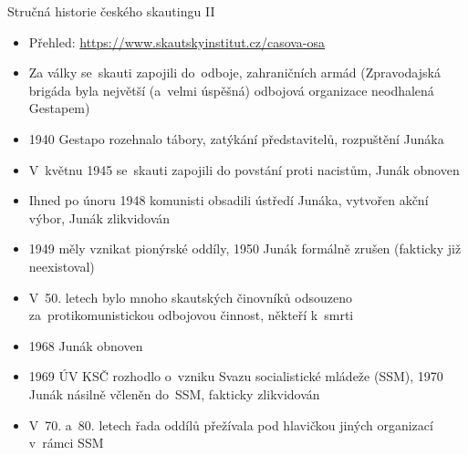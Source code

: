 \documentclass[compress, xelatex, 11pt, xcolor=dvipsnames, print, aspectratio=169,
	hyperref={
		bookmarks=true,
		unicode=true,
		colorlinks=true,
		pdftitle={Skautska vychovna metoda},
		plainpages=false,
		pdfauthor={Vojtech Zeisek},
		pdfsubject={Skautska vychovna metoda a jeji vyvoj za posledni stoleti a desetileti},
		pdfcreator={XeLaTeX},
		pdfkeywords={Junak, Pedagogika, Skaut, Skauting, Vychovna metoda},
		linkcolor=Red, %
		anchorcolor=ForestGreen, %
		citecolor=ForestGreen, %
		filecolor=ForestGreen, %
		menucolor=ForestGreen, %
		urlcolor=Sepia, %
		pdftex},
	url={hyphens, lowtilde} %
	]{beamer}
\begin{document}
\begin{frame}{Stručná historie českého skautingu II}
	\begin{itemize}
		\item Přehled: \url{https://www.skautskyinstitut.cz/casova-osa}
		\item Za války se~skauti zapojili do~odboje, zahraničních armád (Zpravodajská brigáda byla největší (a~velmi úspěšná) odbojová organizace neodhalená Gestapem)
		\item 1940 Gestapo rozehnalo tábory, zatýkání představitelů, rozpuštění Junáka
		\item V~květnu 1945 se~skauti zapojili do povstání proti nacistům, Junák obnoven
		\item Ihned po únoru 1948 komunisti obsadili ústředí Junáka, vytvořen akční výbor, Junák zlikvidován
		\item 1949 měly vznikat pionýrské oddíly, 1950 Junák formálně zrušen (fakticky již neexistoval)
		\item V~50. letech bylo mnoho skautských činovníků odsouzeno za~protikomunistickou odbojovou činnost, někteří k~smrti
		\item 1968 Junák obnoven
		\item 1969 ÚV KSČ rozhodlo o~vzniku Svazu socialistické mládeže (SSM), 1970 Junák násilně včleněn do~SSM, fakticky zlikvidován
		\item V~70. a~80. letech řada oddílů přežívala pod hlavičkou jiných organizací v~rámci SSM
	\end{itemize}
\end{frame}
\end{document}
